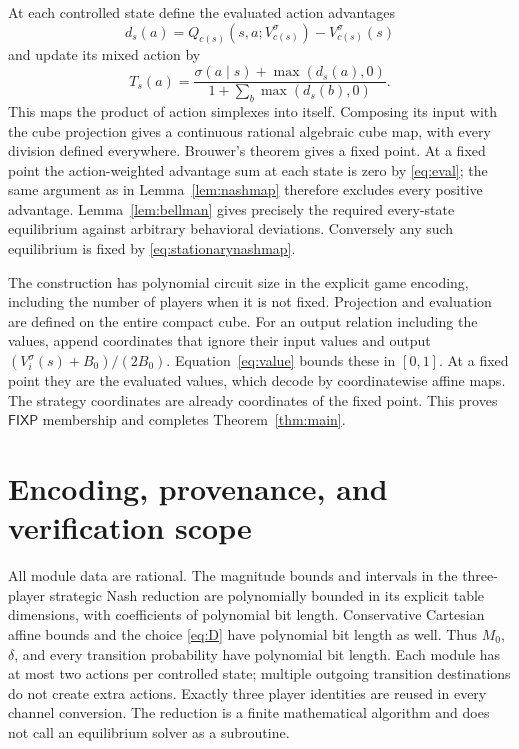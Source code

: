 \documentclass[11pt,a4paper]{article}
\numberwithin{equation}{section}
\theoremstyle{definition}
\newcommand{\FIXP}{\mathsf{FIXP}}
\begin{document}
At each controlled state define the evaluated action advantages
\[
 d_s(a)=Q_{c(s)}(s,a;V_{c(s)}^\sigma)-V_{c(s)}^\sigma(s)
\]
and update its mixed action by
\begin{equation}\label{eq:stationarynashmap}
 T_s(a)=\frac{\sigma(a\mid s)+\max(d_s(a),0)}
                  {1+\sum_b\max(d_s(b),0)}.
\end{equation}
This maps the product of action simplexes into itself. Composing its
input with the cube projection gives a continuous rational algebraic
cube map, with every division defined everywhere. Brouwer's theorem
gives a fixed point. At a fixed point the action-weighted advantage
sum at each state is zero by \eqref{eq:eval}; the same argument as in
Lemma~\ref{lem:nashmap} therefore excludes every positive advantage.
Lemma~\ref{lem:bellman} gives precisely the required every-state
equilibrium against arbitrary behavioral deviations. Conversely any
such equilibrium is fixed by \eqref{eq:stationarynashmap}.

The construction has polynomial circuit size in the explicit game
encoding, including the number of players when it is not fixed.
Projection and evaluation are defined on the entire compact cube.
For an output relation including the values, append coordinates that
ignore their input values and output
\((V_i^\sigma(s)+B_0)/(2B_0)\). Equation~\eqref{eq:value} bounds
these in \([0,1]\). At a fixed point they are the evaluated values,
which decode by coordinatewise affine maps. The strategy coordinates
are already coordinates of the fixed point. This proves \(\FIXP\)
membership and completes Theorem~\ref{thm:main}.

\section{Encoding, provenance, and verification scope}\label{sec:scope}

All module data are rational. The magnitude bounds and intervals in
the three-player strategic Nash reduction are polynomially bounded
in its explicit table dimensions, with coefficients of polynomial bit
length. Conservative Cartesian affine bounds and the choice
\eqref{eq:D} have polynomial bit length as well. Thus \(M_0\),
\(\delta\), and every transition probability have polynomial bit
length. Each module has at most two actions per controlled state;
multiple outgoing transition destinations do not create extra actions.
Exactly three player identities are reused in every channel conversion.
The reduction is a finite mathematical algorithm and does not call an
equilibrium solver as a subroutine.
\end{document}
